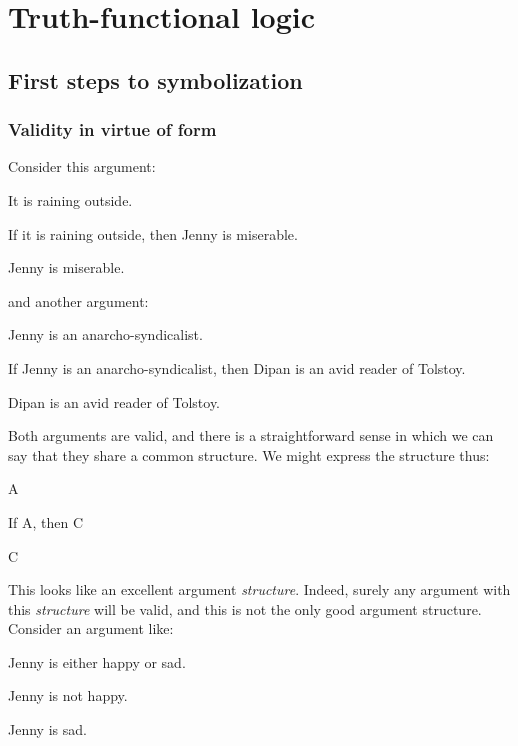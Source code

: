 \part{Truth-functional logic}
\label{ch.TFL}

\chapter{First steps to symbolization}

\section{Validity in virtue of form}\label{s:ValidityInVirtueOfForm}
Consider this argument:
	\begin{earg}
		\item[] It is raining outside.
		\item[] If it is raining outside, then Jenny is miserable.
		\item[\therefore] Jenny is miserable.
	\end{earg}
and another argument:
	\begin{earg}
		\item[] Jenny is an anarcho-syndicalist.
		\item[] If Jenny is an anarcho-syndicalist, then Dipan is an avid reader of Tolstoy.
		\item[\therefore] Dipan is an avid reader of Tolstoy.
	\end{earg}
Both arguments are valid, and there is a straightforward sense in which we can say that they share a common structure. We might express the structure thus:
	\begin{earg}
		\item[] A
		\item[] If A, then C
		\item[\therefore] C
	\end{earg}
This looks like an excellent argument \emph{structure}. Indeed, surely any argument with this \emph{structure} will be valid, and this is not the only good argument structure. Consider an argument like:
	\begin{earg}
		\item[] Jenny is either happy or sad.
		\item[] Jenny is not happy.
		\item[\therefore] Jenny is sad.
	\end{earg}
